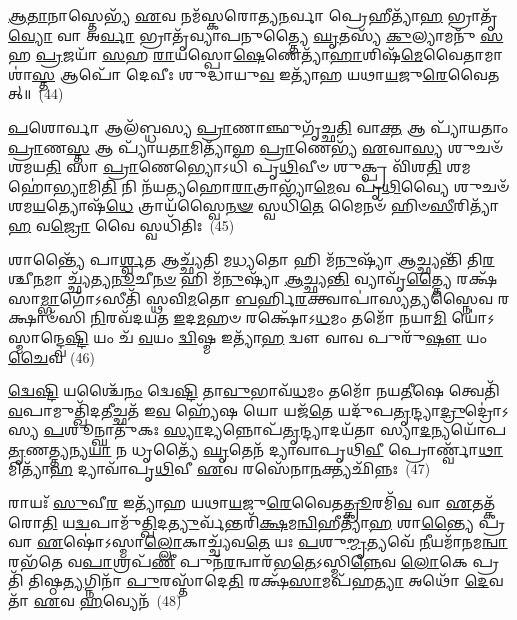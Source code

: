 \-\ul{𑌆}\-\-\ul{𑌤𑌾}\-𑌨𑌾𑌸𑍍𑌤𑍇𑌭𑍍𑌯᳴ \ul{𑌏}\-𑌵 𑌨𑌮᳴𑌸𑍍𑌕𑌰𑍋𑌤𑍍𑌯\-\ul{𑌨}\-𑌰𑍍𑌵𑌾 𑌪𑍍𑌰𑍇𑌹𑍀𑌤𑍍𑌯𑌾᳴\-\ul{𑌹} 𑌭𑍍𑌰𑌾𑌤𑍃᳴\-\ul{𑌵𑍍𑌯𑍋} 𑌵𑌾 𑌅\-\ul{𑌰𑍍𑌵𑌾} 𑌭𑍍𑌰𑌾𑌤𑍃᳴𑌵𑍍𑌯𑌾𑌪𑌨𑍁𑌤𑍍𑌤𑍍𑌯𑍈 \ul{𑌘𑍃}\-𑌤𑌸𑍍𑌯᳴ \ul{𑌕𑍁}\-𑌲𑍍𑌯𑌾𑌮𑌨𑍁᳴ \ul{𑌸}\-𑌹 \ul{𑌪𑍍𑌰}\-𑌜𑌯𑌾᳴ \ul{𑌸}\-𑌹 \ul{𑌰𑌾}\-𑌯𑌸𑍍𑌪𑍋\-\ul{𑌷𑍇}\-𑌣𑍇𑌤𑍍𑌯𑌾᳴\-\ul{𑌹𑌾}\-𑌶𑌿𑌷᳴\-\ul{𑌮𑍇}\-𑌵𑍈𑌤𑌾𑌮𑌾 𑌶𑌾॑\-\ul{𑌸𑍍𑌤} 𑌆𑌪𑍋᳴ 𑌦𑍇𑌵𑍀𑌃 𑌶𑍁𑌦𑍍𑌧𑌾𑌯𑍁\-\ul{𑌵} 𑌇𑌤𑍍𑌯𑌾᳴𑌹 𑌯𑌥𑌾\-\ul{𑌯}\-𑌜𑍁\-\ul{𑌰𑍇}\-𑌵𑍈𑌤𑌤𑍍॥~(44)

{\anuvakamend[{\-\ul{𑌲𑍋}\-𑌕𑌾𑌯᳴ 𑌨𑍀𑌯\-\ul{𑌤𑍇} 𑌯\-\ul{𑌦𑍍𑌬}\-𑌰𑍍\mbox{}𑌹𑍀 \ul{𑌰}\-𑌶𑍍𑌮𑌯𑌃᳴ \ul{𑌸}\-𑌪𑍍𑌤𑌤𑍍𑌰𑌿𑍞᳴𑌶𑌚𑍍𑌚}]}%

\-\ul{𑌪}\-𑌶𑍋𑌰𑍍𑌵𑌾 𑌆𑌲᳴𑌬𑍍𑌧𑌸𑍍𑌯 \ul{𑌪𑍍𑌰𑌾}\-𑌣𑌾𑌞𑍍𑌛𑍁𑌗𑍃᳴𑌚𑍍𑌛\-\ul{𑌤𑌿} 𑌵𑌾\-\ul{𑌕𑍍𑌤} 𑌆 𑌪𑍍𑌯𑌾᳴𑌯𑌤𑌾𑌂 \ul{𑌪𑍍𑌰𑌾}\-𑌣\-\ul{𑌸𑍍𑌤} 𑌆 𑌪𑍍𑌯𑌾᳴𑌯\-\ul{𑌤𑌾}\-𑌮𑌿𑌤𑍍𑌯𑌾᳴𑌹 \ul{𑌪𑍍𑌰𑌾}\-𑌣𑍇𑌭𑍍𑌯᳴ \ul{𑌏}\-𑌵𑌾\-\ul{𑌸𑍍𑌯} 𑌶𑍁𑌚𑍞᳴ 𑌶𑌮𑌯\-\ul{𑌤𑌿} 𑌸𑌾 \ul{𑌪𑍍𑌰𑌾}\-𑌣𑍇𑌭𑍍𑌯𑍋\-𑌽𑌧𑌿᳴ 𑌪𑍃\-\ul{𑌥𑌿}\-𑌵𑍀𑍞 𑌶𑍁𑌕𑍍𑌪𑍍𑌰 𑌵𑌿᳴𑌶\-\ul{𑌤𑌿} 𑌶𑌮𑌹𑍋॑\-\ul{𑌭𑍍𑌯𑌾}\-𑌮𑌿\-\ul{𑌤𑌿} 𑌨𑌿 𑌨᳴𑌯𑌤𑍍𑌯𑌹𑍋\-\ul{𑌰𑌾}\-𑌤𑍍𑌰𑌾𑌭𑍍𑌯𑌾᳴\-\ul{𑌮𑍇}\-𑌵 𑌪𑍃᳴\-\ul{𑌥𑌿}\-𑌵𑍍𑌯𑍈 𑌶𑍁𑌚𑍞᳴ 𑌶𑌮\-\ul{𑌯}\-𑌤𑍍𑌯𑍋𑌷᳴\-\ul{𑌧𑍇} 𑌤𑍍𑌰𑌾𑌯᳴𑌸𑍍𑌵𑍈\-\ul{𑌨}\-\-\ul{𑍟} 𑌸𑍍𑌵𑌧𑌿᳴\-\ul{𑌤𑍇} 𑌮𑍈𑌨𑍞᳴ 𑌹𑌿𑍞\-\ul{𑌸𑍀}\-𑌰𑌿𑌤𑍍𑌯𑌾᳴\-\ul{𑌹} 𑌵\-\ul{𑌜𑍍𑌰𑍋} 𑌵𑍈 𑌸𑍍𑌵𑌧𑌿᳴𑌤𑌿𑌃~(45)

𑌶𑌾𑌨𑍍𑌤𑍍𑌯𑍈᳴ 𑌪𑌾\-\ul{𑌰𑍍𑌶𑍍𑌵}\-𑌤 𑌆𑌚𑍍𑌛𑍍𑌯᳴𑌤𑌿 𑌮\-\ul{𑌧𑍍𑌯}\-𑌤𑍋 𑌹𑌿 𑌮᳴\-\ul{𑌨𑍁}\-𑌷𑍍𑌯𑌾᳴ \ul{𑌆}\-𑌚𑍍𑌛𑍍𑌯𑌨𑍍𑌤𑌿᳴ 𑌤𑌿\-\ul{𑌰}\-𑌶𑍍𑌚𑍀\-\ul{𑌨}\-𑌮𑌾 𑌚𑍍𑌛𑍍𑌯᳴𑌤𑍍𑌯\-\ul{𑌨𑍂}\-𑌚𑍀\-\ul{𑌨}\-\-\ul{𑍞} 𑌹𑌿 𑌮᳴\-\ul{𑌨𑍁}\-𑌷𑍍𑌯𑌾᳴ \ul{𑌆}\-𑌚𑍍𑌛𑍍𑌯\-\ul{𑌨𑍍𑌤𑌿} 𑌵𑍍𑌯𑌾𑌵𑍃᳴\-\ul{𑌤𑍍𑌤𑍍𑌯𑍈} 𑌰𑌕𑍍𑌷᳴𑌸𑌾\-\ul{𑌮𑍍𑌭𑌾}\-𑌗𑍋᳴\-𑌽𑌸𑍀𑌤𑌿᳴ 𑌸𑍍𑌥𑌵𑌿\-\ul{𑌮}\-𑌤𑍋 \ul{𑌬}\-𑌰𑍍\mbox{}𑌹𑌿\-\ul{𑌰}\-𑌕𑍍𑌤𑍍𑌵𑌾𑌪𑌾॑𑌸𑍍𑌯\-\ul{𑌤𑍍𑌯}\-𑌸𑍍𑌨𑍈𑌵 𑌰𑌕𑍍𑌷𑌾𑍞᳴𑌸𑌿 \ul{𑌨𑌿}\-𑌰𑌵᳴𑌦𑌯𑌤 \ul{𑌇}\-𑌦\-\ul{𑌮}\-𑌹𑍞 𑌰𑌕𑍍𑌷𑍋᳴\-𑌽\-\ul{𑌧}\-𑌮𑌂 𑌤𑌮𑍋᳴ 𑌨𑌯𑌾\-\ul{𑌮𑌿} 𑌯𑍋॑\-𑌽𑌸𑍍𑌮𑌾𑌨𑍍𑌦𑍍𑌵𑍇\-\ul{𑌷𑍍𑌟𑌿} 𑌯𑌂 𑌚᳴ \ul{𑌵}\-𑌯𑌂 \ul{𑌦𑍍𑌵𑌿}\-𑌷𑍍𑌮 𑌇𑌤𑍍𑌯𑌾᳴\-\ul{𑌹} 𑌦𑍍𑌵𑍗 𑌵𑌾𑌵 𑌪𑍁𑌰𑍁᳴\-\ul{𑌷𑍗} 𑌯𑌂 \ul{𑌚𑍈}\-𑌵~(46)

\-\ul{𑌦𑍍𑌵𑍇}\-\-\ul{𑌷𑍍𑌟𑌿} 𑌯𑌶𑍍𑌚𑍈᳴\-\ul{𑌨𑌂} 𑌦𑍍𑌵𑍇\-\ul{𑌷𑍍𑌟𑌿} 𑌤𑌾\-\ul{𑌵𑍁}\-𑌭𑌾𑌵᳴\-\ul{𑌧}\-𑌮𑌂 𑌤𑌮𑍋᳴ 𑌨𑌯\-\ul{𑌤𑍀}\-𑌷𑍇 𑌤𑍍𑌵𑍇𑌤𑌿᳴ \ul{𑌵}\-𑌪𑌾𑌮𑍁𑌤𑍍𑌖𑌿᳴𑌦\-\ul{𑌤𑍀}\-𑌚𑍍𑌛𑌤᳴ 𑌇\-\ul{𑌵} 𑌹𑍍𑌯𑍇᳴𑌷 𑌯𑍋 𑌯𑌜᳴\-\ul{𑌤𑍇} 𑌯𑌦𑍁᳴𑌪\-\ul{𑌤𑍃}\-𑌨𑍍𑌦𑍍𑌯𑌾\-\ul{𑌦𑍍𑌰𑍁}\-𑌦𑍍𑌰𑍋॑\-𑌽𑌸𑍍𑌯 \ul{𑌪}\-𑌶𑍂𑌨𑍍𑌘𑌾𑌤𑍁᳴𑌕𑌃 \ul{𑌸𑍍𑌯𑌾}\-𑌦𑍍𑌯𑌨𑍍𑌨𑍋𑌪᳴\-\ul{𑌤𑍃}\-𑌨𑍍𑌦𑍍𑌯𑌾𑌦𑌯᳴𑌤𑌾 𑌸𑍍𑌯𑌾\-\ul{𑌦}\-𑌨𑍍𑌯𑌯𑍋᳴𑌪\-\ul{𑌤𑍃}\-𑌣\-\ul{𑌤𑍍𑌤𑍍𑌯}\-𑌨𑍍𑌯\-\ul{𑌯𑌾} 𑌨 𑌧𑍃𑌤𑍍𑌯𑍈᳴ \ul{𑌘𑍃}\-𑌤𑍇𑌨᳴ 𑌦𑍍𑌯𑌾𑌵𑌾𑌪𑍃𑌥𑌿\-\ul{𑌵𑍀} 𑌪𑍍𑌰𑍋𑌰𑍍𑌣𑍍𑌵𑌾᳴\-\ul{𑌥𑌾}\-𑌮𑌿𑌤𑍍𑌯𑌾᳴\-\ul{𑌹} 𑌦𑍍𑌯𑌾𑌵𑌾᳴𑌪𑍃\-\ul{𑌥𑌿}\-𑌵𑍀 \ul{𑌏}\-𑌵 𑌰𑌸𑍇᳴𑌨𑌾\-\ul{𑌨}\-𑌕𑍍𑌤𑍍𑌯𑌛𑌿᳴𑌨𑍍𑌨𑌃~(47)

𑌰𑌾𑌯𑌃᳴ \ul{𑌸𑍁}\-𑌵𑍀\-\ul{𑌰} 𑌇𑌤𑍍𑌯𑌾᳴𑌹 𑌯𑌥𑌾\-\ul{𑌯}\-𑌜𑍁\-\ul{𑌰𑍇}\-𑌵𑍈𑌤\-\ul{𑌤𑍍𑌕𑍍𑌰𑍂}\-𑌰𑌮𑌿᳴\-\ul{𑌵} 𑌵𑌾 \ul{𑌏}\-𑌤𑌤𑍍𑌕᳴𑌰𑍋\-\ul{𑌤𑌿} 𑌯\-\ul{𑌦𑍍𑌵}\-𑌪𑌾𑌮𑍁᳴\-\ul{𑌤𑍍𑌖𑌿}\-𑌦\-\ul{𑌤𑍍𑌯𑍁}\-𑌰𑍍𑌵᳴𑌨𑍍𑌤𑌰𑌿᳴\-\ul{𑌕𑍍𑌷}\-𑌮\-\ul{𑌨𑍍𑌵𑌿}\-𑌹𑍀𑌤𑍍𑌯𑌾᳴\-\ul{𑌹} 𑌶𑌾\-\ul{𑌨𑍍𑌤𑍍𑌯𑍈} 𑌪𑍍𑌰 𑌵𑌾 \ul{𑌏}\-𑌷𑍋॑\-𑌽𑌸𑍍𑌮𑌾\-\ul{𑌲𑍍𑌲𑍋}\-𑌕𑌾𑌚𑍍𑌚𑍍𑌯᳴𑌵\-\ul{𑌤𑍇} 𑌯𑌃 \ul{𑌪}\-𑌶𑍁\-\ul{𑌮𑍍𑌮𑍃}\-𑌤𑍍𑌯𑌵𑍇᳴ \ul{𑌨𑍀}\-𑌯𑌮𑌾᳴𑌨𑌮\-\ul{𑌨𑍍𑌵𑌾}\-𑌰𑌭᳴𑌤𑍇 𑌵\-\ul{𑌪𑌾}\-𑌶𑍍𑌰𑌪᳴\-\ul{𑌣𑍀} 𑌪𑍁𑌨᳴\-\ul{𑌰}\-𑌨𑍍𑌵𑌾𑌰᳴𑌭\-\ul{𑌤𑍇}\-\-𑌽𑌸𑍍𑌮𑌿\-\ul{𑌨𑍍𑌨𑍇}\-𑌵 \ul{𑌲𑍋}\-𑌕𑍇 𑌪𑍍𑌰𑌤𑌿᳴ 𑌤𑌿𑌷𑍍𑌠\-\ul{𑌤𑍍𑌯}\-𑌗𑍍𑌨𑌿𑌨𑌾᳴ \ul{𑌪𑍁}\-𑌰𑌸𑍍𑌤𑌾᳴𑌦𑍇\-\ul{𑌤𑌿} 𑌰𑌕𑍍𑌷᳴\-\ul{𑌸𑌾}\-𑌮𑌪᳴𑌹\-\ul{𑌤𑍍𑌯𑌾} 𑌅𑌥𑍋᳴ \ul{𑌦𑍇}\-𑌵𑌤𑌾᳴ \ul{𑌏}\-𑌵 \ul{𑌹}\-𑌵𑍍𑌯𑍇𑌨᳴~(48)

